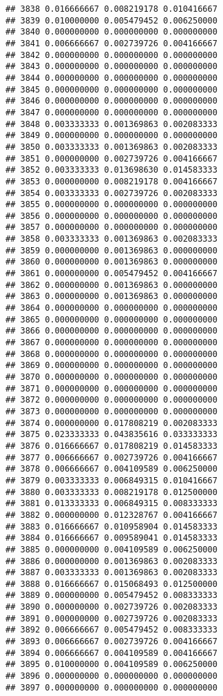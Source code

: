 \documentclass[
]{article}
\begin{document}
\begin{verbatim}
## 3838 0.016666667 0.008219178 0.010416667
## 3839 0.010000000 0.005479452 0.006250000
## 3840 0.000000000 0.000000000 0.000000000
## 3841 0.006666667 0.002739726 0.004166667
## 3842 0.000000000 0.000000000 0.000000000
## 3843 0.000000000 0.000000000 0.000000000
## 3844 0.000000000 0.000000000 0.000000000
## 3845 0.000000000 0.000000000 0.000000000
## 3846 0.000000000 0.000000000 0.000000000
## 3847 0.000000000 0.000000000 0.000000000
## 3848 0.003333333 0.001369863 0.002083333
## 3849 0.000000000 0.000000000 0.000000000
## 3850 0.003333333 0.001369863 0.002083333
## 3851 0.000000000 0.002739726 0.004166667
## 3852 0.003333333 0.013698630 0.014583333
## 3853 0.000000000 0.008219178 0.004166667
## 3854 0.003333333 0.002739726 0.002083333
## 3855 0.000000000 0.000000000 0.000000000
## 3856 0.000000000 0.000000000 0.000000000
## 3857 0.000000000 0.000000000 0.000000000
## 3858 0.003333333 0.001369863 0.002083333
## 3859 0.000000000 0.001369863 0.000000000
## 3860 0.000000000 0.001369863 0.000000000
## 3861 0.000000000 0.005479452 0.004166667
## 3862 0.000000000 0.001369863 0.000000000
## 3863 0.000000000 0.001369863 0.000000000
## 3864 0.000000000 0.000000000 0.000000000
## 3865 0.000000000 0.000000000 0.000000000
## 3866 0.000000000 0.000000000 0.000000000
## 3867 0.000000000 0.000000000 0.000000000
## 3868 0.000000000 0.000000000 0.000000000
## 3869 0.000000000 0.000000000 0.000000000
## 3870 0.000000000 0.000000000 0.000000000
## 3871 0.000000000 0.000000000 0.000000000
## 3872 0.000000000 0.000000000 0.000000000
## 3873 0.000000000 0.000000000 0.000000000
## 3874 0.000000000 0.017808219 0.002083333
## 3875 0.023333333 0.043835616 0.033333333
## 3876 0.016666667 0.017808219 0.014583333
## 3877 0.006666667 0.002739726 0.004166667
## 3878 0.006666667 0.004109589 0.006250000
## 3879 0.003333333 0.006849315 0.010416667
## 3880 0.003333333 0.008219178 0.012500000
## 3881 0.013333333 0.006849315 0.008333333
## 3882 0.000000000 0.012328767 0.004166667
## 3883 0.016666667 0.010958904 0.014583333
## 3884 0.016666667 0.009589041 0.014583333
## 3885 0.000000000 0.004109589 0.006250000
## 3886 0.000000000 0.001369863 0.002083333
## 3887 0.003333333 0.001369863 0.002083333
## 3888 0.016666667 0.015068493 0.012500000
## 3889 0.000000000 0.005479452 0.008333333
## 3890 0.000000000 0.002739726 0.002083333
## 3891 0.000000000 0.002739726 0.002083333
## 3892 0.006666667 0.005479452 0.008333333
## 3893 0.006666667 0.002739726 0.004166667
## 3894 0.006666667 0.004109589 0.004166667
## 3895 0.010000000 0.004109589 0.006250000
## 3896 0.000000000 0.000000000 0.000000000
## 3897 0.000000000 0.000000000 0.000000000

\end{verbatim}
\end{document}
